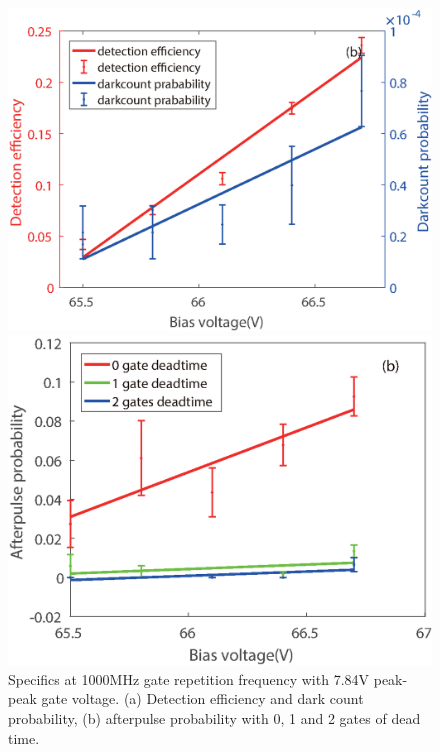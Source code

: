\documentclass[%
 reprint,
superscriptaddress,
 amsmath,amssymb,
 aps,
]{revtex4-1}
\begin{document}
\begin{figure}
\begin{minipage}{0.45\linewidth}
\centering
\includegraphics[width = 1\textwidth]{figure/darkcount_fit.eps}%
\end{minipage}
\begin{minipage}{0.45\linewidth}
\centering
\includegraphics[width = 1\textwidth]{figure/afterpulse_fit.eps}%
\end{minipage}
\vskip -0.1in
\caption{\label{fig:fit}Specifics at 1000MHz gate repetition frequency with 7.84V peak-peak gate voltage. (a) Detection efficiency and dark count probability, (b) afterpulse probability with 0, 1 and 2 gates of dead time.}
\vskip -0.1in
\end{figure}
\end{document}
